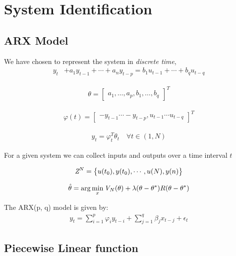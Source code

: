 \section{System Identification}
\subsection{ARX Model}
	We have chosen to represent the system in \textit{discrete time},
	\begin{align}
		y_t &+ a_1 y_{t-1} + \cdots + a_n y_{t-p} = b_1 u_{t-1} + \cdots + b_q u_{t-q}
	\end{align}

	\begin{align}
		\theta = \begin{bmatrix}
		a_1, \ldots, a_p, b_1, \ldots, b_q
		\end{bmatrix}^T
	\end{align} 

	\begin{align}
		\varphi(t) = \begin{bmatrix}
		-y_{t-1} \cdots - y_{t-p}, u_{t-1} \cdots u_{t-q}
		\end{bmatrix}^T
	\end{align}

	\begin{align}
		y_t = \varphi^T_t \theta_t \quad  \forall t \in (1, N)
	\end{align}



	For a given system we can collect inputs and outputs over a time
	interval $t$

	\begin{align}
		\emph{Z}^N = \big \{u(t_0), y(t_0), \cdots, u(N), y(n)\big \}
	\end{align}


	\begin{align}
		\hat{\theta} = \arg\min_{x} \emph{V}_N(\theta) + \lambda(\theta - \theta^*)R(\theta - \theta^*)
	\end{align}

	The ARX(p, q) model is given by:
	\begin{align}
	y_t = \sum_{i=1}^p \varphi_i y_{t-i} + \sum_{j=1}^q \beta_j x_{t-j} + \epsilon_t
	\end{align}


\subsection{Piecewise Linear function}

